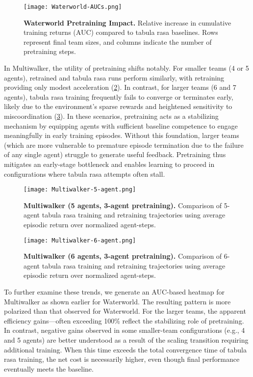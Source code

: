 \begin{figure}[ht]
    \centering
    \texttt{[image: Waterworld-AUCs.png]}
    \caption{\textbf{Waterworld Pretraining Impact.} 
    Relative increase in cumulative training returns (AUC) compared to tabula rasa baselines. 
    Rows represent final team sizes, and columns indicate the number of pretraining steps.}
    \label{con1:fig:waterworld-aucs}
\end{figure}

In Multiwalker, the utility of pretraining shifts notably. 
For smaller teams (4 or 5 agents), retrained and tabula rasa runs perform similarly, 
with retraining providing only modest acceleration (\cref{con1:fig:multiwalker-5}). 
In contrast, for larger teams (6 and 7 agents), tabula rasa training frequently fails to 
converge or terminates early, likely due to the environment's sparse rewards and heightened 
sensitivity to miscoordination (\cref{con1:fig:multiwalker-6}). 
In these scenarios, pretraining acts as a stabilizing mechanism by equipping agents 
with sufficient baseline competence to engage meaningfully in early training episodes. 
Without this foundation, larger teams (which are more vulnerable to premature episode termination 
due to the failure of any single agent) struggle to generate useful feedback. 
Pretraining thus mitigates an early-stage bottleneck and enables learning to proceed 
in configurations where tabula rasa attempts often stall.

\begin{figure}[!ht]
    \centering
    \texttt{[image: Multiwalker-5-agent.png]}
    \caption{\textbf{Multiwalker (5 agents, 3-agent pretraining).} Comparison of 
    5-agent tabula rasa training and retraining trajectories using average 
    episodic return over normalized agent-steps.}
    \label{con1:fig:multiwalker-5}
\end{figure}

\vspace{2em}

\begin{figure}[!ht]
    \centering
    \texttt{[image: Multiwalker-6-agent.png]}
    \caption{\textbf{Multiwalker (6 agents, 3-agent pretraining).} Comparison of 
    6-agent tabula rasa training and retraining trajectories using average 
    episodic return over normalized agent-steps.}
    \label{con1:fig:multiwalker-6}
\end{figure}

To further examine these trends, we generate an AUC-based 
heatmap for Multiwalker as shown earlier for Waterworld. 
The resulting pattern is more polarized than that observed for Waterworld.
For the larger teams, the apparent efficiency gains—often exceeding 100\% 
reflect the stabilizing role of pretraining. In contrast, 
negative gains observed in some smaller-team configurations (e.g., 4 and 5 agents) 
are better understood as a result of the scaling transition requiring additional training. 
When this time exceeds the total convergence time of tabula rasa training, the net cost 
is necessarily higher, even though final performance eventually meets the baseline.


